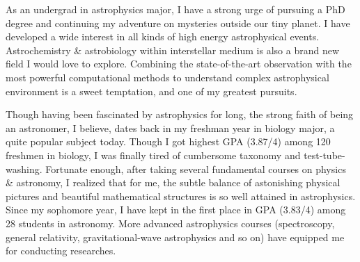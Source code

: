 \documentclass[11pt, a4paper]{awesome-cv} %
\begin{document}
\makecvheader %



\begin{cvletter}


As an undergrad in astrophysics major, I have a strong urge of pursuing a PhD degree and continuing my adventure on mysteries outside our tiny planet. I have developed a wide interest in all kinds of high energy astrophysical events. Astrochemistry \& astrobiology within interstellar medium is also a brand new field I would love to explore. Combining the state-of-the-art observation with the most powerful computational methods to understand complex astrophysical environment is a sweet temptation, and one of my greatest pursuits.

Though having been fascinated by astrophysics for long, the strong faith of being an astronomer, I believe, dates back in my freshman year in biology major, a quite popular subject today. Though I got highest GPA (3.87/4) among 120 freshmen in biology, I was finally tired of cumbersome taxonomy and test-tube-washing. Fortunate enough, after taking several fundamental courses on physics \& astronomy, I realized that for me, the subtle balance of astonishing physical pictures and beautiful mathematical structures is so well attained in astrophysics. Since my sophomore year, I have kept in the first place in GPA (3.83/4) among 28 students in astronomy. More advanced astrophysics courses (spectroscopy, general relativity, gravitational-wave astrophysics and so on) have equipped me for conducting researches.




\end{cvletter}
\end{document}
